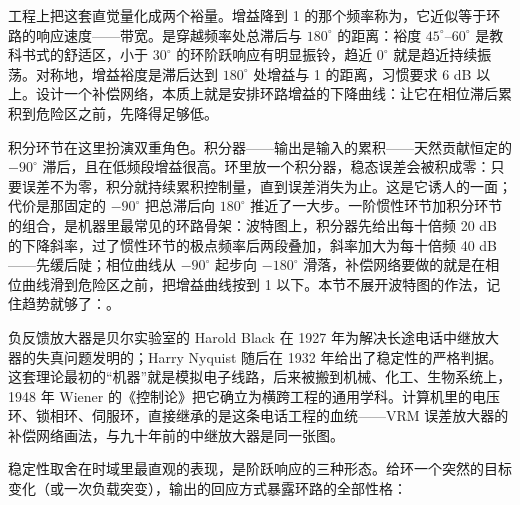 工程上把这套直觉量化成两个裕量。增益降到 1 的那个频率称为，它近似等于环路的响应速度——带宽。是穿越频率处总滞后与 $180^{\circ}$ 的距离：裕度 $45^{\circ}$--$60^{\circ}$ 是教科书式的舒适区，小于 $30^{\circ}$ 的环阶跃响应有明显振铃，趋近 $0^{\circ}$ 就是趋近持续振荡。对称地，增益裕度是滞后达到 $180^{\circ}$ 处增益与 1 的距离，习惯要求 6 dB 以上。设计一个补偿网络，本质上就是安排环路增益的下降曲线：让它在相位滞后累积到危险区之前，先降得足够低。

积分环节在这里扮演双重角色。积分器——输出是输入的累积——天然贡献恒定的 $-90^{\circ}$ 滞后，且在低频段增益很高。环里放一个积分器，稳态误差会被积成零：只要误差不为零，积分就持续累积控制量，直到误差消失为止。这是它诱人的一面；代价是那固定的 $-90^{\circ}$ 把总滞后向 $180^{\circ}$ 推近了一大步。一阶惯性环节加积分环节的组合，是机器里最常见的环路骨架：波特图上，积分器先给出每十倍频 20 dB 的下降斜率，过了惯性环节的极点频率后两段叠加，斜率加大为每十倍频 40 dB——先缓后陡；相位曲线从 $-90^{\circ}$ 起步向 $-180^{\circ}$ 滑落，补偿网络要做的就是在相位曲线滑到危险区之前，把增益曲线按到 1 以下。本节不展开波特图的作法，记住趋势就够了：。

\begin{classicnote}
负反馈放大器是贝尔实验室的 Harold Black 在 1927 年为解决长途电话中继放大器的失真问题发明的；Harry Nyquist 随后在 1932 年给出了稳定性的严格判据。这套理论最初的“机器”就是模拟电子线路，后来被搬到机械、化工、生物系统上，1948 年 Wiener 的《控制论》把它确立为横跨工程的通用学科。计算机里的电压环、锁相环、伺服环，直接继承的是这条电话工程的血统——VRM 误差放大器的补偿网络画法，与九十年前的中继放大器是同一张图。
\end{classicnote}

稳定性取舍在时域里最直观的表现，是阶跃响应的三种形态。给环一个突然的目标变化（或一次负载突变），输出的回应方式暴露环路的全部性格：

